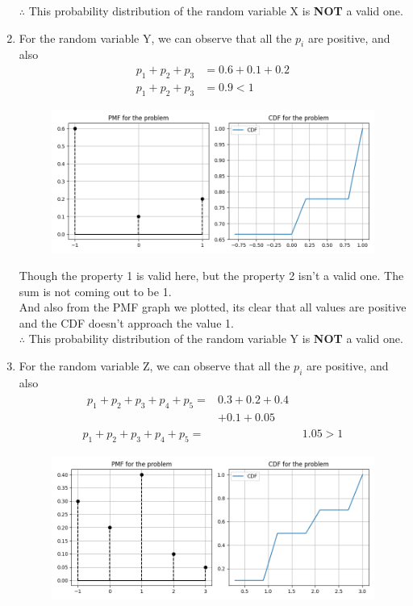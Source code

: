 \documentclass[journal,12pt,twocolumn]{IEEEtran}
\begin{document}
\begin{enumerate}[label=(\roman*)]
	      $\therefore$ This probability distribution of the random variable X is \textbf{NOT} a valid one.\\
	      \item For the random variable Y, we can observe that all the $p_i$ are positive, and also
	      \begin{align}
	      p_1 + p_2 + p_3 &= 0.6 + 0.1 + 0.2\\
	       p_1 + p_2 + p_3 &= 0.9 < 1
	      \end{align}
	      \begin{figure}[htb] 
		\centering
		\includegraphics[width=\columnwidth]{Figure_3}
	\end{figure}
	      Though the property 1 is valid here, but the property 2 isn't a valid one. The sum is not coming out to be 1.\\
	      And also from the PMF graph we plotted, its clear that all values are positive and the CDF doesn't approach the value 1.\\
	      $\therefore$ This probability distribution of the random variable Y is \textbf{NOT} a valid one.\\
	      \item For the random variable Z, we can observe that all the $p_i$ are positive, and also
 \begin{align}
 \begin{split}
p_1 + p_2 + p_3 + p_4 + p_5 ={}& 0.3 + 0.2 + 0.4 \\
                               &+ 0.1 + 0.05
 \end{split}\\
p_1 + p_2 + p_3 + p_4 + p_5 ={}& 1.05 > 1
 \end{align}
 \begin{figure}[htb] 
		\centering
		\includegraphics[width=\columnwidth]{Figure_4}

\end{figure}
\end{enumerate}
\end{document}
